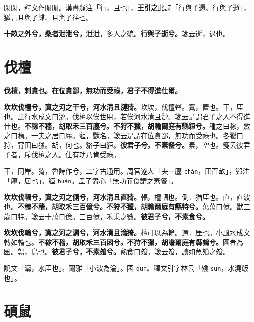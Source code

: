 \begin{quoting}閑閑，釋文作閒閒。漢書顏注「行，且也」，\textbf{王引之}此詩「行與子還、行與子逝」，猶言且與子歸、且與子往也。\end{quoting}

\textbf{十畝之外兮，桑者泄泄兮，}{\footnotesize 泄泄，多人之貌。}\textbf{行與子逝兮。}{\footnotesize 箋云逝，逮也。}

\section{伐檀}


\textbf{伐檀，刺貪也。在位貪鄙，無功而受祿，君子不得進仕爾。}

\textbf{坎坎伐檀兮，寘之河之干兮，河水清且漣猗。}{\footnotesize 坎坎，伐檀聲。寘，置也。干，厓也。風行水成文曰漣。伐檀以俟世用，若俟河水清且漣。箋云是謂君子之人不得進仕也。}\textbf{不稼不穡，胡取禾三百廛兮。不狩不獵，胡瞻爾庭有縣貆兮。}{\footnotesize 種之曰稼，斂之曰穡。一夫之居曰廛。貆，獸名。箋云是謂在位貪鄙，無功而受祿也。冬獵曰狩，宵田曰獵。胡，何也。貉子曰貆。}\textbf{彼君子兮，不素餐兮。}{\footnotesize 素，空也。箋云彼君子者，斥伐檀之人。仕有功乃肯受祿。}

\begin{quoting}干，同岸。猗，魯詩作兮，二字古通用。周官遂人「夫一廛 \texttt{chán}，田百畝」，鄭注「廛，居也」。貆 \texttt{huán}。孟子盡心「無功而食謂之素餐」。\end{quoting}

\textbf{坎坎伐輻兮，寘之河之側兮，河水清且直猗。}{\footnotesize 輻，檀輻也。側，猶厓也。直，直波也。}\textbf{不稼不穡，胡取禾三百億兮。不狩不獵，胡瞻爾庭有縣特兮。}{\footnotesize 萬萬曰億。獸三歲曰特。箋云十萬曰億。三百億，禾秉之數。}\textbf{彼君子兮，不素食兮。}

\textbf{坎坎伐輪兮，寘之河之漘兮，河水清且淪猗。}{\footnotesize 檀可以為輪。漘，厓也。小風水成文轉如輪也。}\textbf{不稼不穡，胡取禾三百囷兮。不狩不獵，胡瞻爾庭有縣鶉兮。}{\footnotesize 圓者為囷。鶉，鳥也。}\textbf{彼君子兮，不素飧兮。}{\footnotesize 熟食曰飧。箋云飧，讀如魚飧之飧。}

\begin{quoting}說文「漘，水厓也」。爾雅「小波為淪」。囷 \texttt{qūn}。釋文引字林云「飧 \texttt{sūn}，水澆飯也」。\end{quoting}

\section{碩鼠}


